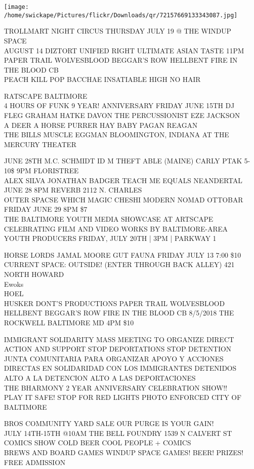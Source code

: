 \documentclass[10pt,letterpaper]{article}
\begin{document}
\texttt{[image: /home/swickape/Pictures/flickr/Downloads/qr/72157669133343087.jpg]}


TROLLMART NIGHT CIRCUS THURSDAY JULY 19 @ THE WINDUP SPACE\\
AUGUST 14 DIZTORT UNIFIED RIGHT ULTIMATE ASIAN TASTE 11PM\\
PAPER TRAIL WOLVESBLOOD BEGGAR'S ROW HELLBENT FIRE IN THE BLOOD CB\\
PEACH KILL POP BACCHAE INSATIABLE HIGH NO HAIR

RATSCAPE BALTIMORE\\
4 HOURS OF FUNK 9 YEAR! ANNIVERSARY FRIDAY JUNE 15TH DJ FLEG GRAHAM HATKE DAVON THE PERCUSSIONIST EZE JACKSON\\
A DEER A HORSE PURRER HAY BABY PAGAN REAGAN\\
THE BILLS MUSCLE EGGMAN BLOOMINGTON, INDIANA AT THE MERCURY THEATER

JUNE 28TH M.C. SCHMIDT ID M THEFT ABLE (MAINE) CARLY PTAK 5{-}10\$ 9PM FLORISTREE\\
ALEX SILVA JONATHAN BADGER TEACH ME EQUALS NEANDERTAL JUNE 28 8PM REVERB 2112 N. CHARLES\\
OUTER SPACSE WHICH MAGIC CHESHI MODERN NOMAD OTTOBAR FRIDAY JUNE 29 8PM \$7\\
THE BALTIMORE YOUTH MEDIA SHOWCASE AT ARTSCAPE CELEBRATING FILM AND VIDEO WORKS BY BALTIMORE{-}AREA YOUTH PRODUCERS FRIDAY, JULY 20TH | 3PM | PARKWAY 1

HORSE LORDS JAMAL MOORE GUT FAUNA FRIDAY JULY 13 7:00 \$10 CURRENT SPACE: OUTSIDE!  (ENTER THROUGH BACK ALLEY) 421 NORTH HOWARD\\
Ewoks\\
HOEL\\
HUSKER DONT'S PRODUCTIONS PAPER TRAIL WOLVESBLOOD HELLBENT BEGGAR'S ROW FIRE IN THE BLOOD CB 8/5/2018 THE ROCKWELL BALTIMORE MD 4PM \$10

IMMIGRANT SOLIDARITY MASS MEETING TO ORGANIZE DIRECT ACTION AND SUPPORT STOP DEPORTATIONS STOP DETENTION\\
JUNTA COMUNITARIA PARA ORGANIZAR APOYO Y ACCIONES DIRECTAS EN SOLIDARIDAD CON LOS IMMIGRANTES DETENIDOS ALTO A LA DETENCION ALTO A LAS DEPORTACIONES\\
THE BHARMONY 2 YEAR ANNIVERSARY CELEBRATION SHOW!!\\
PLAY IT SAFE!  STOP FOR RED LIGHTS PHOTO ENFORCED CITY OF BALTIMORE

BROS COMMUNITY YARD SALE OUR PURGE IS YOUR GAIN!\\
JULY 14TH{-}15TH @10AM THE BELL FOUNDRY 1539 N CALVERT ST\\
COMICS SHOW COLD BEER COOL PEOPLE + COMICS\\
BREWS AND BOARD GAMES WINDUP SPACE GAMES!  BEER!  PRIZES!  FREE ADMISSION
\end{document}
